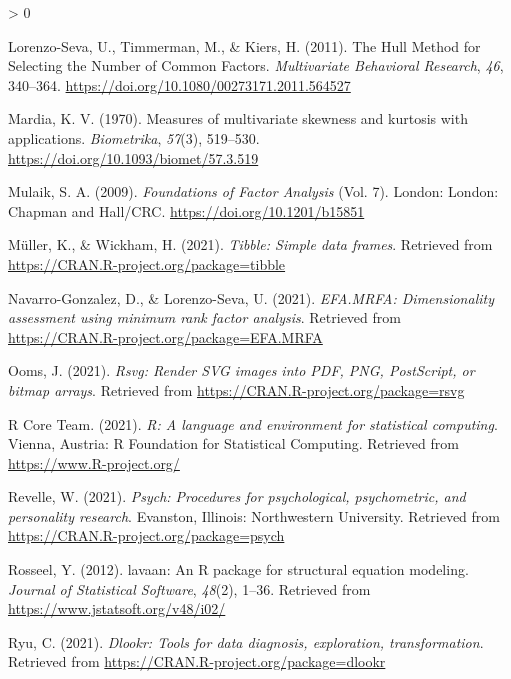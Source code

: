 \documentclass[
  english,
  man]{apa6}
\newlength{\cslhangindent}
\newenvironment{CSLReferences}[2] %
 {%
  \setlength{\parindent}{0pt}
  \ifodd #1 \everypar{\setlength{\hangindent}{\cslhangindent}}\ignorespaces\fi
  \ifnum #2 > 0
  \setlength{\parskip}{#2\baselineskip}
  \fi
 }%
 {}
\begin{document}
\begin{CSLReferences}{1}{0}
\leavevmode\hypertarget{ref-lorenzo-sevaHullMethodSelecting2011}{}%
Lorenzo-Seva, U., Timmerman, M., \& Kiers, H. (2011). The {Hull Method} for {Selecting} the {Number} of {Common Factors}. \emph{Multivariate Behavioral Research}, \emph{46}, 340--364. \url{https://doi.org/10.1080/00273171.2011.564527}

\leavevmode\hypertarget{ref-mardiaMeasuresMultivariateSkewness1970}{}%
Mardia, K. V. (1970). Measures of multivariate skewness and kurtosis with applications. \emph{Biometrika}, \emph{57}(3), 519--530. \url{https://doi.org/10.1093/biomet/57.3.519}

\leavevmode\hypertarget{ref-mulaikFoundationsFactorAnalysis2009}{}%
Mulaik, S. A. (2009). \emph{Foundations of {Factor Analysis}} (Vol. 7). {London}: {London: Chapman and Hall/CRC}. \url{https://doi.org/10.1201/b15851}

\leavevmode\hypertarget{ref-R-tibble}{}%
Müller, K., \& Wickham, H. (2021). \emph{Tibble: Simple data frames}. Retrieved from \url{https://CRAN.R-project.org/package=tibble}

\leavevmode\hypertarget{ref-R-EFA.MRFA}{}%
Navarro-Gonzalez, D., \& Lorenzo-Seva, U. (2021). \emph{EFA.MRFA: Dimensionality assessment using minimum rank factor analysis}. Retrieved from \url{https://CRAN.R-project.org/package=EFA.MRFA}

\leavevmode\hypertarget{ref-R-rsvg}{}%
Ooms, J. (2021). \emph{Rsvg: Render SVG images into PDF, PNG, PostScript, or bitmap arrays}. Retrieved from \url{https://CRAN.R-project.org/package=rsvg}

\leavevmode\hypertarget{ref-R-base}{}%
R Core Team. (2021). \emph{R: A language and environment for statistical computing}. Vienna, Austria: R Foundation for Statistical Computing. Retrieved from \url{https://www.R-project.org/}

\leavevmode\hypertarget{ref-R-psych}{}%
Revelle, W. (2021). \emph{Psych: Procedures for psychological, psychometric, and personality research}. Evanston, Illinois: Northwestern University. Retrieved from \url{https://CRAN.R-project.org/package=psych}

\leavevmode\hypertarget{ref-R-lavaan}{}%
Rosseel, Y. (2012). {lavaan}: An {R} package for structural equation modeling. \emph{Journal of Statistical Software}, \emph{48}(2), 1--36. Retrieved from \url{https://www.jstatsoft.org/v48/i02/}

\leavevmode\hypertarget{ref-R-dlookr}{}%
Ryu, C. (2021). \emph{Dlookr: Tools for data diagnosis, exploration, transformation}. Retrieved from \url{https://CRAN.R-project.org/package=dlookr}


\end{CSLReferences}
\end{document}
